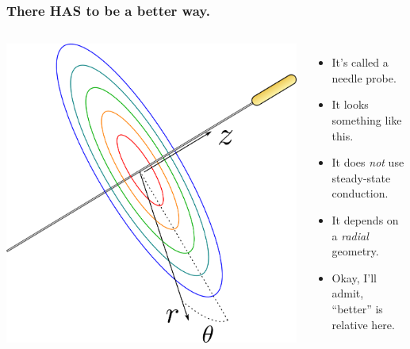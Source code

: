 \documentclass{beamer}
\begin{document}
\begin{frame}
\frametitle{There HAS to be a better way.}
\begin{columns}[c]
     \includegraphics[width=\textwidth]{fig/basic_geometry.png}
    \begin{itemize}
    \item It's called a needle probe.
    \item It looks something like this.
    \item It does \emph{not} use steady-state conduction.
    \item It depends on a \emph{radial} geometry.
    \item Okay, I'll admit, ``better'' is relative here.
    \end{itemize}
\end{columns}
\end{frame}
\end{document}
